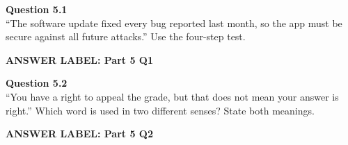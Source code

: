 \documentclass[12pt]{article}
\newcommand{\answerbox}[2]{%
\vspace{0.15em}
\noindent\textbf{#1}\par
\vspace{0.05em}
\noindent\fbox{%
\begin{minipage}[t][#2]{\dimexpr\textwidth-2\fboxsep-2\fboxrule}
\rule{\textwidth}{0pt}
\vspace{#2}
\end{minipage}
}\par
\vspace{0.25em}
}
\begin{document}
\textbf{Question 5.1}\\[-0.15em]
``The software update fixed every bug reported last month, so the app must be secure against all future attacks.'' Use the four-step test.

\answerbox{ANSWER LABEL: Part 5 Q1}{2.35in}

\textbf{Question 5.2}\\[-0.15em]
``You have a right to appeal the grade, but that does not mean your answer is right.'' Which word is used in two different senses? State both meanings.

\answerbox{ANSWER LABEL: Part 5 Q2}{1.65in}
\end{document}
